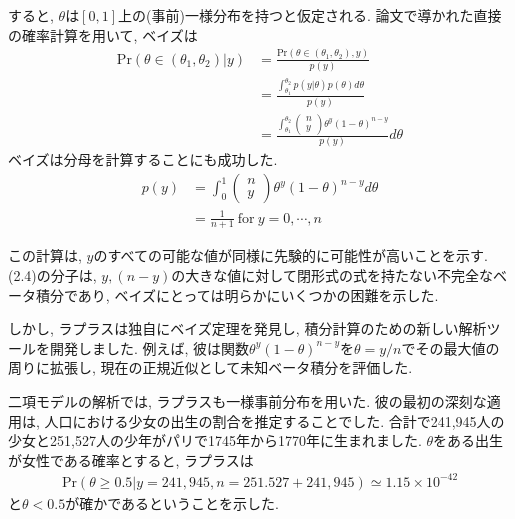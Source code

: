 \documentclass[10pt,dvipdfmx,a4]{beamer}
\newcommand{\eq}[1]{\begin{align}#1\end{align}}
\newcommand{\eqn}[1]{\begin{align*}#1\end{align*}}
\begin{document}

\begin{frame}
すると, $\theta$は$[0,1]$上の(事前)一様分布を持つと仮定される.
論文で導かれた直接の確率計算を用いて, ベイズは
\eq{\text{Pr}(\theta\in(\theta_1,\theta_2)|y)&=\frac{\text{Pr}(\theta\in(\theta_1,\theta_2),y)}{p(y)}\nonumber\\
&=\frac{\int_{\theta_1}^{\theta_2}p(y|\theta)p(\theta)d\theta}{p(y)}\nonumber\\
&=\frac{\int_{\theta_1}^{\theta_2}\left(\begin{array}{c}n\\y\end{array}\right)\theta^y(1-\theta)^{n-y}}{p(y)}d\theta}
ベイズは分母を計算することにも成功した.
\eq{p(y)&=\int_0^1\left(\begin{array}{c}n\\y\end{array}\right)\theta^y(1-\theta)^{n-y}d\theta\nonumber\\
&=\frac{1}{n+1}\ \text{for}\ y=0,\cdots,n}
\end{frame}


\begin{frame}
この計算は, $y$のすべての可能な値が同様に先験的に可能性が高いことを示す.
(2.4)の分子は, $y, (n-y)$の大きな値に対して閉形式の式を持たない不完全なベータ積分であり, ベイズにとっては明らかにいくつかの困難を示した.

しかし, ラプラスは独自にベイズ定理を発見し, 積分計算のための新しい解析ツールを開発しました.
例えば, 彼は関数$\theta^y(1-\theta)^{n-y}$を$\theta=y/n$でその最大値の周りに拡張し, 現在の正規近似として未知ベータ積分を評価した.

二項モデルの解析では, ラプラスも一様事前分布を用いた.
彼の最初の深刻な適用は, 人口における少女の出生の割合を推定することでした.
合計で241,945人の少女と251,527人の少年がパリで1745年から1770年に生まれました.
$\theta$をある出生が女性である確率とすると, ラプラスは
\eqn{\text{Pr}(\theta\geq 0.5|y=241,945, n=251.527+241,945)\simeq 1.15\times 10^{-42}}
と$\theta<0.5$が確かであるということを示した.
\end{frame}

\end{document}

